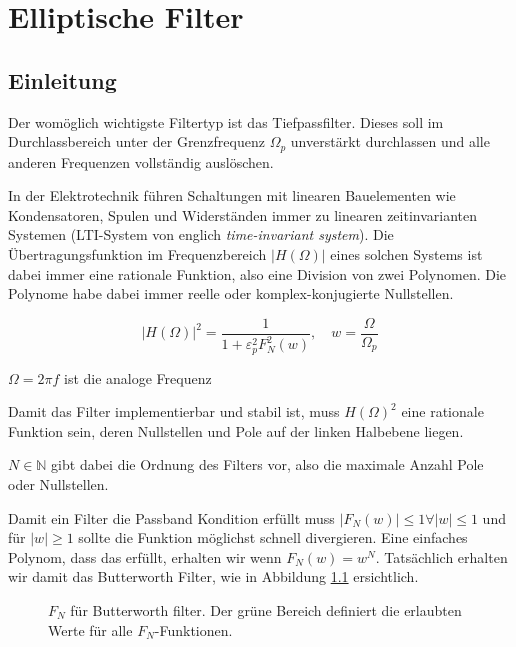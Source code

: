%
%
%
\chapter{Elliptische Filter\label{chapter:ellfilter}}
\begin{refsection}


\section{Einleitung}




Der womöglich wichtigste Filtertyp ist das Tiefpassfilter.
Dieses soll im Durchlassbereich unter der Grenzfrequenz $\Omega_p$ unverstärkt durchlassen und alle anderen Frequenzen vollständig auslöschen.


In der Elektrotechnik führen Schaltungen mit linearen Bauelementen wie Kondensatoren, Spulen und Widerständen immer zu linearen zeitinvarianten Systemen (LTI-System von englich \textit{time-invariant system}).
Die Übertragungsfunktion im Frequenzbereich $|H(\Omega)|$ eines solchen Systems ist dabei immer eine rationale Funktion, also eine Division von zwei Polynomen.
Die Polynome habe dabei immer reelle oder komplex-konjugierte Nullstellen.


\begin{equation} \label{ellfilter:eq:h_omega}
    | H(\Omega)|^2 = \frac{1}{1 + \varepsilon_p^2 F_N^2(w)}, \quad w=\frac{\Omega}{\Omega_p}
\end{equation}

$\Omega = 2 \pi f$ ist die analoge Frequenz


Damit das Filter implementierbar und stabil ist, muss $H(\Omega)^2$ eine rationale Funktion sein, deren Nullstellen und Pole auf der linken Halbebene liegen.

$N \in \mathbb{N} $ gibt dabei die Ordnung des Filters vor, also die maximale Anzahl Pole oder Nullstellen.

Damit ein Filter die Passband Kondition erfüllt muss $|F_N(w)| \leq 1 \forall |w| \leq 1$ und für $|w| \geq 1$ sollte die Funktion möglichst schnell divergieren.
Eine einfaches Polynom, dass das erfüllt, erhalten wir wenn $F_N(w) = w^N$.
Tatsächlich erhalten wir damit das Butterworth Filter, wie in Abbildung \ref{ellfilter:fig:butterworth} ersichtlich.
\begin{figure}
    \centering
    
    \caption{$F_N$ für Butterworth filter. Der grüne Bereich definiert die erlaubten Werte für alle $F_N$-Funktionen.}
    \label{ellfilter:fig:butterworth}
\end{figure}


\end{refsection}
